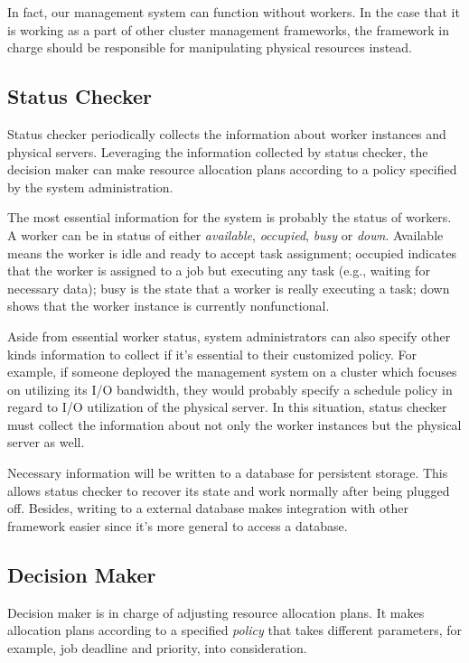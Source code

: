 In fact, our management system can function without workers.
In the case that it is working as a part of other cluster management
frameworks, the framework in charge should be responsible for
manipulating physical resources instead.

\subsection{Status Checker}

Status checker periodically collects the information about worker
instances and physical servers.
Leveraging the information collected by status checker, the decision
maker can make resource allocation plans according to a policy specified
by the system administration.

The most essential information for the system is probably the status of
workers.
A worker can be in status of either \emph{available}, \emph{occupied},
\emph{busy} or \emph{down}.
Available means the worker
is idle and ready to accept task assignment; occupied indicates that the
worker is assigned to a job but executing any task (e.g., waiting for
necessary data); busy is the state that a worker is really executing a
task; down shows that the worker instance is currently nonfunctional. 

Aside from essential worker status, system administrators can also
specify other kinds information to collect if it's essential to  their
customized policy.
For example, if someone deployed the management system on a cluster
which focuses on utilizing its I/O bandwidth, they would probably
specify a schedule policy in regard to I/O utilization of the physical
server.
In this situation, status checker must collect the information about
not only the worker instances but the physical server as well.

Necessary information will be written to a database for persistent
storage.
This allows status checker to recover its state and work normally after
being plugged off.
Besides, writing to a external database makes integration with other
framework easier since it's more general to access a database.

\subsection{Decision Maker}

Decision maker is in charge of adjusting resource allocation plans.
It
makes allocation plans according to a specified \emph{policy} that takes
different parameters, for example, job deadline and priority, into
consideration. 

